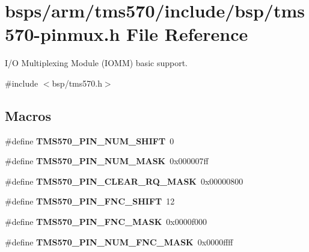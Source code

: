 \hypertarget{tms570-pinmux_8h}{}\section{bsps/arm/tms570/include/bsp/tms570-\/pinmux.h File Reference}
\label{tms570-pinmux_8h}


I/O Multiplexing Module (I\+O\+MM) basic support.  


{\ttfamily \#include $<$bsp/tms570.\+h$>$}\newline
\subsection*{Macros}
\begin{DoxyCompactItemize}
\item 
\mbox{\label{tms570-pinmux_8h_a1fce9ce1a38ed008d25aa51173f0e9e7}} 
\#define {\bfseries T\+M\+S570\+\_\+\+P\+I\+N\+\_\+\+N\+U\+M\+\_\+\+S\+H\+I\+FT}~0
\item 
\mbox{\label{tms570-pinmux_8h_afd124bd0ffa0f5ff642e61e0cbc233f3}} 
\#define {\bfseries T\+M\+S570\+\_\+\+P\+I\+N\+\_\+\+N\+U\+M\+\_\+\+M\+A\+SK}~0x000007ff
\item 
\mbox{\label{tms570-pinmux_8h_ab4933df39afd9340ef7c05ee94b4953f}} 
\#define {\bfseries T\+M\+S570\+\_\+\+P\+I\+N\+\_\+\+C\+L\+E\+A\+R\+\_\+\+R\+Q\+\_\+\+M\+A\+SK}~0x00000800
\item 
\mbox{\label{tms570-pinmux_8h_a1096dedacd14bc9307da0c59f260dfef}} 
\#define {\bfseries T\+M\+S570\+\_\+\+P\+I\+N\+\_\+\+F\+N\+C\+\_\+\+S\+H\+I\+FT}~12
\item 
\mbox{\label{tms570-pinmux_8h_ac42b8c9c83b682f57630e36083f12562}} 
\#define {\bfseries T\+M\+S570\+\_\+\+P\+I\+N\+\_\+\+F\+N\+C\+\_\+\+M\+A\+SK}~0x0000f000
\item 
\mbox{\label{tms570-pinmux_8h_a5f96ebf5a5dfc6d0156396ddceae0ba0}} 
\#define {\bfseries T\+M\+S570\+\_\+\+P\+I\+N\+\_\+\+N\+U\+M\+\_\+\+F\+N\+C\+\_\+\+M\+A\+SK}~0x0000ffff
\item 
\mbox{\label{tms570-pinmux_8h_ab97a3dc957c0efa04de974b84a74fd53}} 

\end{DoxyCompactItemize}
